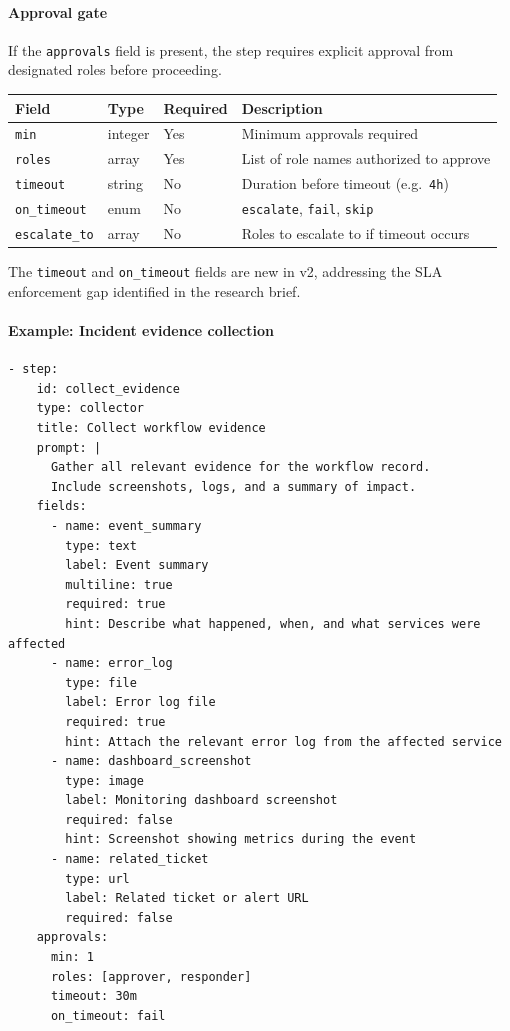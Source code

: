 \paragraph{Approval gate}
\label{subsec:approval-gate}

If the \texttt{approvals} field is present, the step requires explicit approval
from designated roles before proceeding.

\begin{center}
\begin{tabular}{lllp{4cm}}
\hline
\textbf{Field} & \textbf{Type} & \textbf{Required} & \textbf{Description} \\
\hline
\texttt{min}          & integer & Yes & Minimum approvals required \\
\texttt{roles}        & array   & Yes & List of role names authorized to approve \\
\texttt{timeout}      & string  & No  & Duration before timeout (e.g.\ \texttt{4h}) \\
\texttt{on\_timeout}  & enum    & No  & \texttt{escalate}, \texttt{fail}, \texttt{skip} \\
\texttt{escalate\_to} & array   & No  & Roles to escalate to if timeout occurs \\
\hline
\end{tabular}
\end{center}

The \texttt{timeout} and \texttt{on\_timeout} fields are new in v2, addressing
the SLA enforcement gap identified in the research brief.

\paragraph{Example: Incident evidence collection}

\begin{verbatim}
- step:
    id: collect_evidence
    type: collector
    title: Collect workflow evidence
    prompt: |
      Gather all relevant evidence for the workflow record.
      Include screenshots, logs, and a summary of impact.
    fields:
      - name: event_summary
        type: text
        label: Event summary
        multiline: true
        required: true
        hint: Describe what happened, when, and what services were affected
      - name: error_log
        type: file
        label: Error log file
        required: true
        hint: Attach the relevant error log from the affected service
      - name: dashboard_screenshot
        type: image
        label: Monitoring dashboard screenshot
        required: false
        hint: Screenshot showing metrics during the event
      - name: related_ticket
        type: url
        label: Related ticket or alert URL
        required: false
    approvals:
      min: 1
      roles: [approver, responder]
      timeout: 30m
      on_timeout: fail
\end{verbatim}

